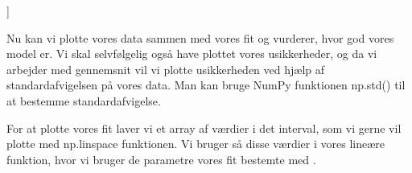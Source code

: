\documentclass[letterpaper,10pt,english]{jupyterBook}
\begin{document}
\begin{sphinxVerbatim}[commandchars=\\\{\}]
      
 
 
\end{sphinxVerbatim}

\begin{sphinxVerbatim}[commandchars=\\\{\}]
[4.4553719  1.29164669]
[[ 0.08314673 \PYGZhy{}0.02868562]
 [\PYGZhy{}0.02868562  0.01115413]]
\end{sphinxVerbatim}

Nu kan vi plotte vores data sammen med vores fit og vurderer, hvor god vores model er. Vi skal selvfølgelig også have plottet vores usikkerheder, og da vi arbejder med gennemsnit vil vi plotte usikkerheden ved hjælp af standardafvigelsen på vores data. Man kan bruge NumPy funktionen np.std() til at bestemme standardafvigelse.

For at plotte vores fit laver vi et array af værdier i det interval, som vi gerne vil plotte med np.linspace funktionen. Vi bruger så disse værdier i vores lineære funktion, hvor vi bruger de parametre vores fit bestemte med .
\end{document}
